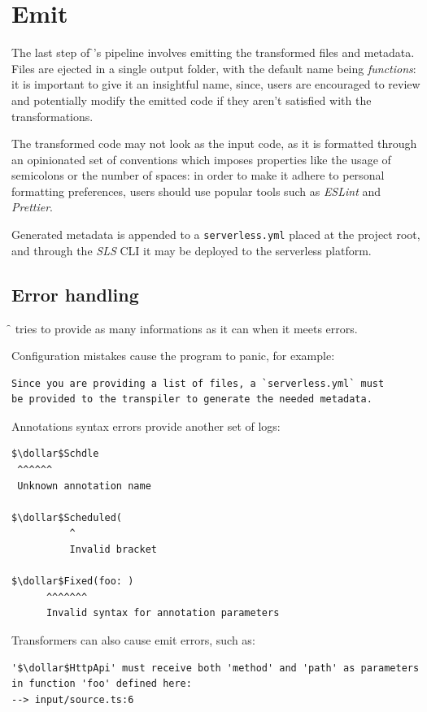 
\section{Emit}

The last step of \f{}'s pipeline involves emitting the transformed files and metadata.
Files are ejected in a single output folder,
with the default name being \textit{functions}: it is important to give it an insightful name,
since, users are encouraged to review and potentially modify the emitted code
if they aren't satisfied with the transformations.

The transformed code may not look as the input code, as it is formatted
through an opinionated set of conventions which imposes properties like
the usage of semicolons or the number of spaces:
in order to make it adhere to personal formatting preferences,
users should use popular tools such as \textit{ESLint} and \textit{Prettier}.

Generated metadata is appended to a \verb|serverless.yml| placed at the project root,
and through the \textit{SLS} CLI it may be deployed to the serverless platform.

\subsection{Error handling}

\f{} tries to provide as many informations as it can when it meets errors.

Configuration mistakes cause the program to panic, for example:
\begin{lstlisting}[language=console]
Since you are providing a list of files, a `serverless.yml` must
be provided to the transpiler to generate the needed metadata.
\end{lstlisting}

Annotations syntax errors provide another set of logs:
\begin{lstlisting}[language=console]
$\dollar$Schdle
 ^^^^^^
 Unknown annotation name

$\dollar$Scheduled(
          ^
          Invalid bracket

$\dollar$Fixed(foo: )
      ^^^^^^^
      Invalid syntax for annotation parameters
\end{lstlisting}

Transformers can also cause emit errors, such as:
\begin{lstlisting}[language=console]
'$\dollar$HttpApi' must receive both 'method' and 'path' as parameters
in function 'foo' defined here:
--> input/source.ts:6
\end{lstlisting}
